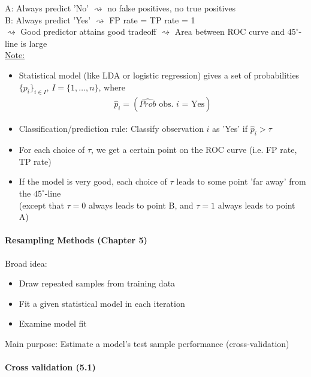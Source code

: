 \documentclass[11pt,a4paper,numbers=endperiod]{scrartcl}
\begin{document}
{A: Always predict 'No' $\rightsquigarrow$ no false positives, no true positives\\
B: Always predict 'Yes' $\rightsquigarrow$ FP rate = TP rate = 1\\
$\rightsquigarrow$ Good predictor attains good tradeoff $\rightsquigarrow$ Area between ROC curve and $45^{\circ}$-line is large\\
\newpage
\underline{Note:} \begin{itemize}
	\item Statistical model (like LDA or logistic regression) gives a set of probabilities $\{p_i\}_{i \in I}$, $I = \{1, \ldots, n\}$, where \begin{align*}
		\hat{p}_i = (\text{$\widehat{Prob}$ obs. $i$ = Yes})
	\end{align*}
	\item Classification/prediction rule: Classify observation $i$ as 'Yes' if $\hat{p}_i > \tau$
	\item For each choice of $\tau$, we get a certain point on the ROC curve (i.e. FP rate, TP rate)
	\item If the model is very good, each choice of $\tau$ leads to some point 'far away' from the $45^{\circ}$-line\\
	(except that $\tau = 0$ always leads to point B, and $\tau = 1$ always leads to point A)
\end{itemize}

\paragraph{Resampling Methods (Chapter 5)}
$ $\\

Broad idea: \begin{itemize}
	\item Draw repeated samples from training data
	\item Fit a given statistical model in each iteration
	\item Examine model fit
\end{itemize}

Main purpose: Estimate a model's test sample performance (cross-validation)\\

\paragraph{Cross validation (5.1)}
$ $\\

}
\end{document}
